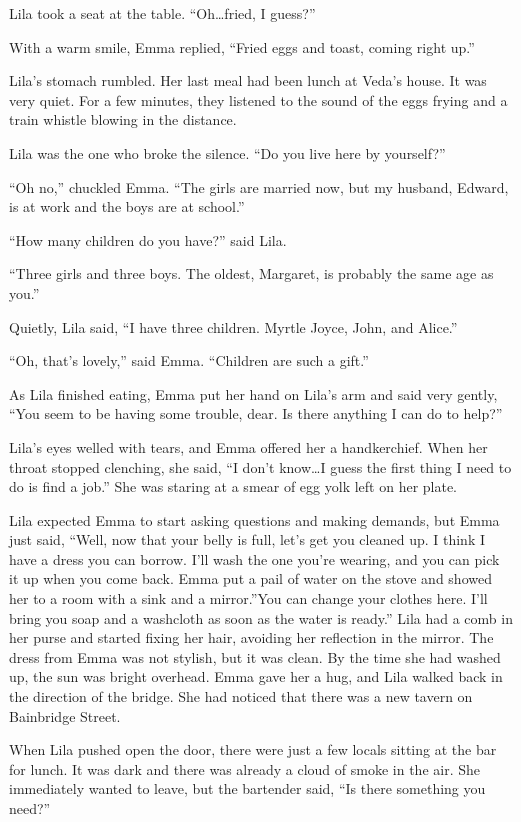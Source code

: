 \documentclass[
  letterpaper,
]{book}
\begin{document}
Lila took a seat at the table. ``Oh\ldots fried, I guess?''

With a warm smile, Emma replied, ``Fried eggs and toast, coming right
up.''

Lila's stomach rumbled. Her last meal had been lunch at Veda's house. It
was very quiet. For a few minutes, they listened to the sound of the
eggs frying and a train whistle blowing in the distance.

Lila was the one who broke the silence. ``Do you live here by
yourself?''

``Oh no,'' chuckled Emma. ``The girls are married now, but my husband,
Edward, is at work and the boys are at school.''

``How many children do you have?'' said Lila.

``Three girls and three boys. The oldest, Margaret, is probably the same
age as you.''

Quietly, Lila said, ``I have three children. Myrtle Joyce, John, and
Alice.''

``Oh, that's lovely,'' said Emma. ``Children are such a gift.''

As Lila finished eating, Emma put her hand on Lila's arm and said very
gently, ``You seem to be having some trouble, dear. Is there anything I
can do to help?''

Lila's eyes welled with tears, and Emma offered her a handkerchief. When
her throat stopped clenching, she said, ``I don't know\ldots I guess the
first thing I need to do is find a job.'' She was staring at a smear of
egg yolk left on her plate.

Lila expected Emma to start asking questions and making demands, but
Emma just said, ``Well, now that your belly is full, let's get you
cleaned up. I think I have a dress you can borrow. I'll wash the one
you're wearing, and you can pick it up when you come back. Emma put a
pail of water on the stove and showed her to a room with a sink and a
mirror.''You can change your clothes here. I'll bring you soap and a
washcloth as soon as the water is ready.'' Lila had a comb in her purse
and started fixing her hair, avoiding her reflection in the mirror. The
dress from Emma was not stylish, but it was clean. By the time she had
washed up, the sun was bright overhead. Emma gave her a hug, and Lila
walked back in the direction of the bridge. She had noticed that there
was a new tavern on Bainbridge Street.

When Lila pushed open the door, there were just a few locals sitting at
the bar for lunch. It was dark and there was already a cloud of smoke in
the air. She immediately wanted to leave, but the bartender said, ``Is
there something you need?''
\end{document}
